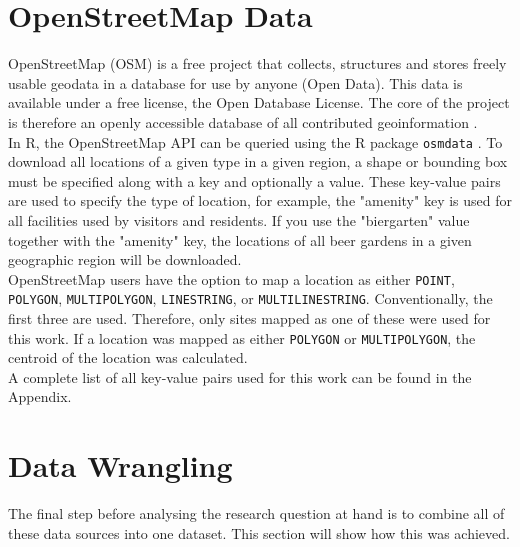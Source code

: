 \section{OpenStreetMap Data}
OpenStreetMap (OSM) is a free project that collects, structures and stores freely usable geodata in a database for use by anyone (Open Data). This data is available under a free license, the Open Database License. The core of the project is therefore an openly accessible database of all contributed geoinformation \autocite[][]{OpenStreetMap}. \\
In R, the OpenStreetMap API can be queried using the R package \texttt{osmdata} \autocite[][]{osmdata}. To download all locations of a given type in a given region, a shape or bounding box must be specified along with a key and optionally a value. These key-value pairs are used to specify the type of location, for example, the "amenity" key is used for all facilities used by visitors and residents. If you use the "biergarten" value together with the "amenity" key, the locations of all beer gardens in a given geographic region will be downloaded. \\
OpenStreetMap users have the option to map a location as either \texttt{POINT}, \texttt{POLYGON}, \texttt{MULTIPOLYGON}, \texttt{LINESTRING}, or \texttt{MULTILINESTRING}. Conventionally, the first three are used. Therefore, only sites mapped as one of these were used for this work. If a location was mapped as either \texttt{POLYGON} or \texttt{MULTIPOLYGON}, the centroid of the location was calculated. \\
A complete list of all key-value pairs used for this work can be found in the Appendix. 
\clearpage
\section{Data Wrangling}
The final step before analysing the research question at hand is to combine all of these data sources into one dataset. This section will show how this was achieved.
